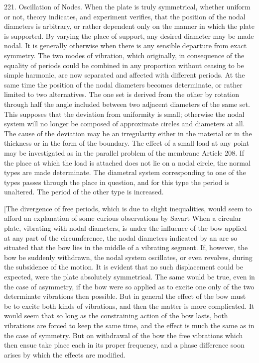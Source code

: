 221. Oscillation of Nodes. %
When the plate is truly symmetrical, whether uniform or not, theory
indicates, and experiment verifies, that the position of the nodal
diameters is arbitrary, or rather dependent only on the manner in which
the plate is supported. By varying the place of support, any desired
diameter may be made nodal. It is generally otherwise when there is any
sensible departure from exact symmetry. The two modes of vibration,
which originally,
in consequence of the equality of periods could be combined in any
proportion without ceasing to be simple harmonic, are now separated and
affected with different periods. At the same time the position of the
nodal diameters becomes determinate, or rather limited to two
alternatives. The one set is derived from the other by rotation through
half the angle included between two adjacent diameters of the same set.
This supposes that the deviation from uniformity is small; otherwise the
nodal system will no longer be composed of approximate circles and
diameters at all. The cause of the deviation may be an irregularity
either in the material or in the thickness or in the form of the
boundary. The effect of a small load at any point may be investigated as
in the parallel problem of the membrane Article 208. If the place at
which the load is attached does not lie on a nodal circle, the normal
types are made determinate. The diametral system corresponding to one of
the types passes through the place in question, and for this type the
period is unaltered. The period of the other type is increased.


[The divergence of free periods, which is due to slight inequalities, would
seem to afford an explanation of some curious observations by Savart When a
circular plate, vibrating with nodal diameters, is under the influence of the
bow applied at any part of the circumference, the nodal diameters indicated by
an arc so situated that the bow lies in the middle of a vibrating segment.
If, however, the bow be suddenly withdrawn, the nodal system
oscillates, or even revolves, during the subsidence of the motion.
It is evident that no such displacement could be expected,
were the plate absolutely symmetrical. The same would be true,
even in the case of asymmetry, if the bow were so applied as to
excite one only of the two determinate vibrations then possible.
But in general the effect of the bow must be to excite both kinds
of vibrations, and then the matter is more complicated. It would
seem that so long as the constraining action of the bow lasts, both
vibrations are forced to keep the same time, and the effect is
much the same as in the case of symmetry. But on withdrawal
of the bow the free vibrations which then ensue take place each in
its proper frequency, and a phase difference soon arises by which
the effects are modified.

